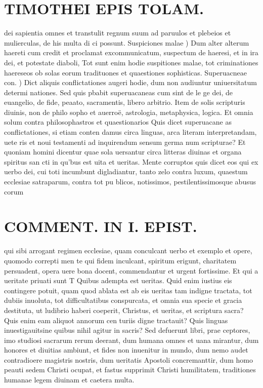 \documentclass{article}
\begin{document}
\begin{pages}
\section*{TIMOTHEI EPIS TOLAM. }
\marginpar{[ p.159 ]}\pstart dei sapientia omnes et transtulit regnum suum ad paruulos et plebeios et mulierculas, de his multa di ci possunt.  \pend\pstart Suspiciones malae ) Dum alter alterum haereti cum credit et proclamat excommunicatum, suspectum de haeresi, et in ira dei, et potestate diaboli, Tot sunt enim hodie suspitiones malae, tot criminationes haereseos ob solas eorum tradituones et quaestiones sophisticas.  \pend\pstart Superuacneae con. ) Dict aliquis conflictationes augeri hodie, dum non audiuntur uniuersitatum determi nationes. Sed quis pbabit superuacaneas cum sint de le ge dei, de euangelio, de fide, peaato, sacramentis, libero arbitrio. Item de solis scripturis diuinis, non de philo sopho et auerroë, astrologia, metaphysica, logica. Et omnia solum contra philosophastros et quaestionarios Quis dicet superuacane as conflictationes, si etiam conten damus circa linguas, arca literam interpretandam, uete ris et noui testamenti ad inquirendum sensum germa num scripturae? Et quoniam homini dicentur quae sola uersantur circa litteras diuinas et organa spiritus san cti in qu'bus est uita et ueritas.  \pend\pstart Mente corruptos quis dicet eos qui ex uerbo dei, cui toti incumbunt digladiantur, tanto zelo contra luxum, quaestum ecclesiae satraparum, contra tot pu blicos, notissimos, pestilentissimosque abusus corum  \pend
\section*{COMMENT. IN I. EPIST. }
\marginpar{[ p.160 ]}\pstart qui sibi arrogant regimen ecclesiae, quam conculcant uerbo et exemplo et opere, quomodo correpti men te qui fidem inculcant, spiritum erigunt, charitatem persuadent, opera uere bona docent, commendantur et urgent fortissime.  \pend\pstart Et qui a ueritate priuati sunt T Quibus adempta est ueritas. Quid enim iustius eis contingere potuit, quam quod ablata est ab eis ueritas tam indigne tractata, tot dubiis inuoluta, tot difficultatibus conspurcata, et omnia sua specie et gracia destituta, ut ludibrio haberi coeperit, Christus, et ueritas, et scriptura sacra? Quis enim eam aliquot annorum cen turiis digne tractauit? Quis linguas inuestigauitsine quibus nihil agitur in sacris? Sed defuerunt libri, prae ceptores, imo studiosi sacrarum rerum deerant, dum humana omnes et uana mirantur, dum honores et diuitias ambiunt, et fides non inuenitur in mundo, dum nemo audet contradioere magistris nostris, dum ueritatis Apostoli concremanttir, dum homo peauti sedem Christi ocupat, et fastus supprimit Christi humilitatem, traditiones humanae legem diuinam et caetera multa.  \pend
{}
{}

\end{pages}
\end{document}
